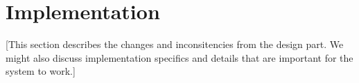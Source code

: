 \section{Implementation}\label{Implementation}
    [This section describes the changes and inconsitencies from the design part. We might also discuss implementation specifics and details that are important for the system to work.]
 

